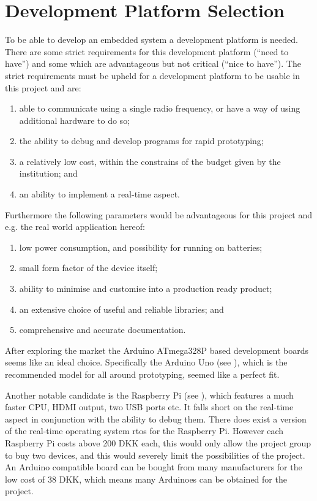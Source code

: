 
\section{Development Platform Selection}
To be able to develop an embedded system a development platform is needed. 
There are some strict requirements for this development platform (``need to have'') and some which are advantageous but not critical (``nice to have'').
The strict requirements must be upheld for a development platform to be usable in this project and are:

\begin{enumerate}[label=\itshape \alph*\upshape)]
\item able to communicate using a single radio frequency, or have a way of using additional hardware to do so;
\item the ability to debug and develop programs for rapid prototyping;
\item a relatively low cost, within the constrains of the budget given by the institution;
and
\item an ability to implement a real-time aspect.
\end{enumerate}

\noindent
Furthermore the following parameters would be advantageous for this project and e.g. the real world application hereof:

\begin{enumerate}[label=\itshape \alph*\upshape), resume]
\item low power consumption, and possibility for running on batteries;
\item small form factor of the device itself;
\item ability to minimise and customise into a production ready product;
\item an extensive choice of useful and reliable libraries;
and
\item comprehensive and accurate documentation.
\end{enumerate}

\bigskip
\noindent
After exploring the market the Arduino ATmega328P based development boards seems like an ideal choice.
Specifically the Arduino Uno (see \cite{ArduinoUNO}), which is the recommended model for all around prototyping, seemed like a perfect fit.

Another notable candidate is the Raspberry Pi (see \cite{RaspberryPI}), which features a much faster CPU, HDMI output, two USB ports etc.
It falls short on the real-time aspect in conjunction with the ability to debug them. 
There does exist a version of the real-time operating system \gls{rtos} for the Raspberry Pi.
However each Raspberry Pi costs above 200 DKK each, this would only allow the project group to buy two devices, and this would severely limit the possibilities of the project.
An Arduino compatible board can be bought from many manufacturers for the low cost of 38 DKK, which means many Arduinoes can be obtained for the project.


